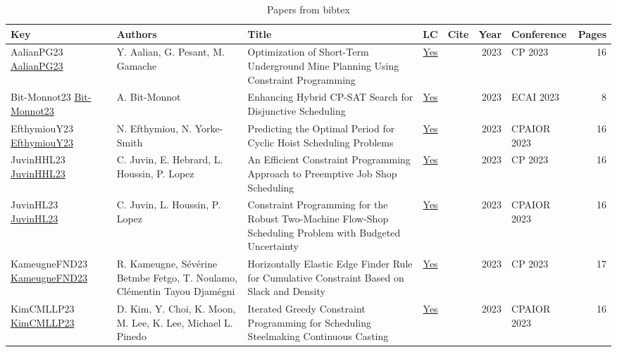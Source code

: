 {\scriptsize
\begin{longtable}{p{3cm}p{6cm}p{7cm}rrrp{3cm}r}
\caption{Papers from bibtex}\\ \toprule
Key & Authors & Title & LC & Cite & Year & Conference & Pages \\ \midrule\endhead
\bottomrule
\endfoot
AalianPG23 \href{https://doi.org/10.4230/LIPIcs.CP.2023.6}{AalianPG23} & Y. Aalian, G. Pesant, M. Gamache & Optimization of Short-Term Underground Mine Planning Using Constraint Programming & \href{papers/AalianPG23.pdf}{Yes} & \cite{AalianPG23} & 2023 & CP 2023 & 16\\
Bit-Monnot23 \href{https://doi.org/10.3233/FAIA230278}{Bit-Monnot23} & A. Bit{-}Monnot & Enhancing Hybrid {CP-SAT} Search for Disjunctive Scheduling & \href{papers/Bit-Monnot23.pdf}{Yes} & \cite{Bit-Monnot23} & 2023 & ECAI 2023 & 8\\
EfthymiouY23 \href{https://doi.org/10.1007/978-3-031-33271-5\_16}{EfthymiouY23} & N. Efthymiou, N. Yorke{-}Smith & Predicting the Optimal Period for Cyclic Hoist Scheduling Problems & \href{papers/EfthymiouY23.pdf}{Yes} & \cite{EfthymiouY23} & 2023 & CPAIOR 2023 & 16\\
JuvinHHL23 \href{https://doi.org/10.4230/LIPIcs.CP.2023.19}{JuvinHHL23} & C. Juvin, E. Hebrard, L. Houssin, P. Lopez & An Efficient Constraint Programming Approach to Preemptive Job Shop Scheduling & \href{papers/JuvinHHL23.pdf}{Yes} & \cite{JuvinHHL23} & 2023 & CP 2023 & 16\\
JuvinHL23 \href{https://doi.org/10.1007/978-3-031-33271-5\_23}{JuvinHL23} & C. Juvin, L. Houssin, P. Lopez & Constraint Programming for the Robust Two-Machine Flow-Shop Scheduling Problem with Budgeted Uncertainty & \href{papers/JuvinHL23.pdf}{Yes} & \cite{JuvinHL23} & 2023 & CPAIOR 2023 & 16\\
KameugneFND23 \href{https://doi.org/10.4230/LIPIcs.CP.2023.20}{KameugneFND23} & R. Kameugne, S{\'{e}}v{\'{e}}rine Betmbe Fetgo, T. Noulamo, Cl{\'{e}}mentin Tayou Djam{\'{e}}gni & Horizontally Elastic Edge Finder Rule for Cumulative Constraint Based on Slack and Density & \href{papers/KameugneFND23.pdf}{Yes} & \cite{KameugneFND23} & 2023 & CP 2023 & 17\\
KimCMLLP23 \href{https://doi.org/10.1007/978-3-031-33271-5\_31}{KimCMLLP23} & D. Kim, Y. Choi, K. Moon, M. Lee, K. Lee, Michael L. Pinedo & Iterated Greedy Constraint Programming for Scheduling Steelmaking Continuous Casting & \href{papers/KimCMLLP23.pdf}{Yes} & \cite{KimCMLLP23} & 2023 & CPAIOR 2023 & 16\\

\end{longtable}}

